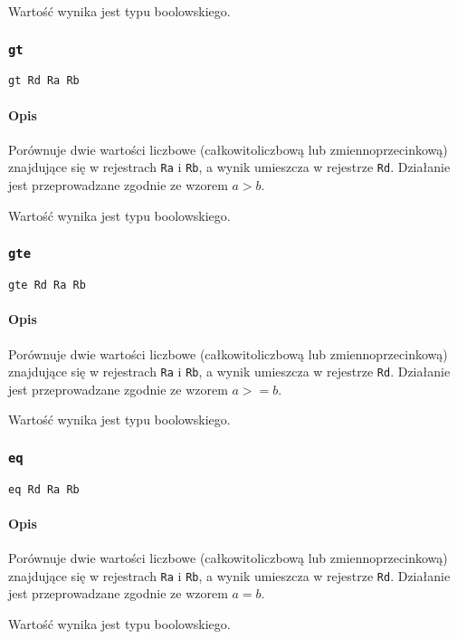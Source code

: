 Wartość wynika jest typu boolowskiego.

\subsubsection{\texttt{gt}}

\begin{lstlisting}
gt Rd Ra Rb
\end{lstlisting}

\paragraph*{Opis} Porównuje dwie wartości liczbowe (całkowitoliczbową lub
zmiennoprzecinkową) znajdujące się w rejestrach \texttt{Ra} i \texttt{Rb}, a
wynik umieszcza w rejestrze \texttt{Rd}. Działanie jest przeprowadzane zgodnie
ze wzorem $a > b$.

Wartość wynika jest typu boolowskiego.

\subsubsection{\texttt{gte}}

\begin{lstlisting}
gte Rd Ra Rb
\end{lstlisting}

\paragraph*{Opis} Porównuje dwie wartości liczbowe (całkowitoliczbową lub
zmiennoprzecinkową) znajdujące się w rejestrach \texttt{Ra} i \texttt{Rb}, a
wynik umieszcza w rejestrze \texttt{Rd}. Działanie jest przeprowadzane zgodnie
ze wzorem $a >= b$.

Wartość wynika jest typu boolowskiego.

\subsubsection{\texttt{eq}}

\begin{lstlisting}
eq Rd Ra Rb
\end{lstlisting}

\paragraph*{Opis} Porównuje dwie wartości liczbowe (całkowitoliczbową lub
zmiennoprzecinkową) znajdujące się w rejestrach \texttt{Ra} i \texttt{Rb}, a
wynik umieszcza w rejestrze \texttt{Rd}. Działanie jest przeprowadzane zgodnie
ze wzorem $a = b$.

Wartość wynika jest typu boolowskiego.
